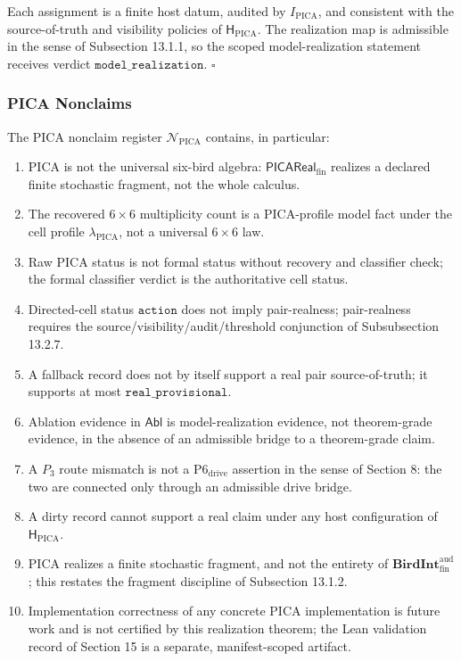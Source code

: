 \documentclass[11pt]{article}
\providecommand{\tightlist}{}
\theoremstyle{definition}
\begin{document}
Each assignment is a finite host datum, audited by \(I_{\mathrm{PICA}}\), and consistent with the source-of-truth and visibility policies of \(\mathsf H_{\mathrm{PICA}}\). The realization map is admissible in the sense of Subsection 13.1.1, so the scoped model-realization statement receives verdict \(\texttt{model\_realization}\). \(\square\)

\subsubsection{PICA Nonclaims}

The PICA nonclaim register \(\mathcal N_{\mathrm{PICA}}\) contains, in particular:

\begin{enumerate}
\def\labelenumi{\arabic{enumi}.}
\tightlist
\item
  PICA is not the universal six-bird algebra: \(\mathsf{PICAReal}_{\mathrm{fin}}\) realizes a declared finite stochastic fragment, not the whole calculus.
\item
  The recovered \(6\times 6\) multiplicity count is a PICA-profile model fact under the cell profile \(\lambda_{\mathrm{PICA}}\), not a universal \(6\times 6\) law.
\item
  Raw PICA status is not formal status without recovery and classifier check; the formal classifier verdict is the authoritative cell status.
\item
  Directed-cell status \(\texttt{action}\) does not imply pair-realness; pair-realness requires the source/visibility/audit/threshold conjunction of Subsubsection 13.2.7.
\item
  A fallback record does not by itself support a real pair source-of-truth; it supports at most \(\texttt{real\_provisional}\).
\item
  Ablation evidence in \(\mathsf{Abl}\) is model-realization evidence, not theorem-grade evidence, in the absence of an admissible bridge to a theorem-grade claim.
\item
  A \(P_3\) route mismatch is not a \(\mathrm{P6}_{\mathrm{drive}}\) assertion in the sense of Section 8: the two are connected only through an admissible drive bridge.
\item
  A dirty record cannot support a real claim under any host configuration of \(\mathsf H_{\mathrm{PICA}}\).
\item
  PICA realizes a finite stochastic fragment, and not the entirety of \(\mathbf{BirdInt}^{\mathrm{aud}}_{\mathrm{fin}}\); this restates the fragment discipline of Subsection 13.1.2.
\item
  Implementation correctness of any concrete PICA implementation is future work and is not certified by this realization theorem; the Lean validation record of Section 15 is a separate, manifest-scoped artifact.
\end{enumerate}
\end{document}
